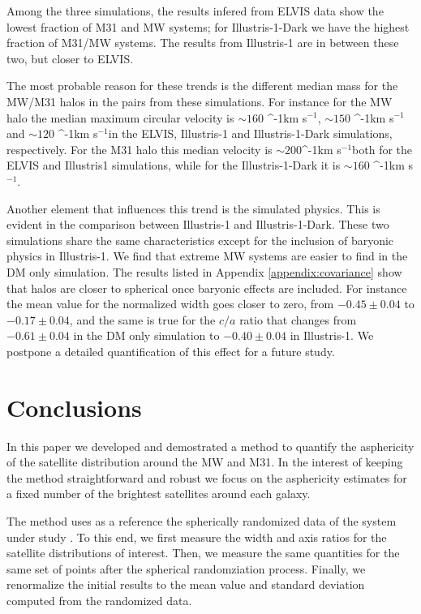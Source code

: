 \documentclass[a4paper,fleqn,usenatbib]{mnras}
\newcommand{\kms}{\ifmmode\mathrm{km\ s}^{-1}\else km s$^{-1}$\fi}
\begin{document}
Among the three simulations, the results infered from ELVIS data show
the lowest fraction of M31 and MW systems; for Illustris-1-Dark we have
the highest fraction of M31/MW systems. The results from Illustris-1
are in between these two, but closer to ELVIS.

The most probable reason for these trends is the different median mass
for the MW/M31 halos in the pairs from these simulations. 
For instance for the MW halo the median maximum circular velocity is
$\sim 160$ \kms, $\sim 150$ \kms and $\sim 120$ \kms in the ELVIS,
Illustris-1 and Illustris-1-Dark simulations, respectively.
For the M31 halo this median velocity is $\sim 200$\kms both for the
ELVIS and Illustris1 simulations, while for the Illustris-1-Dark it is
$\sim 160$ \kms. 

Another element that influences this trend is the simulated physics.
This is evident in the comparison between Illustris-1 and Illustris-1-Dark.
These two simulations share the same characteristics except for the
inclusion of baryonic physics in Illustris-1.
We find that extreme MW systems are easier to find in the DM only
simulation. 
The results listed in Appendix \ref{appendix:covariance} show that
halos are closer to spherical once baryonic effects are included. 
For instance the mean value for the normalized width goes closer to
zero, from $-0.45\pm 0.04$  to $-0.17\pm0.04$, and the same is true
for the $c/a$ ratio that changes from $-0.61\pm0.04$ in the DM only
simulation to $-0.40\pm 0.04$ in Illustris-1.  
We postpone a detailed quantification of this effect for a future
study. 

\section{Conclusions}\label{sec:conclusions}

In this paper we developed and demostrated a method to quantify the
asphericity of the satellite distribution around the MW and M31.  
In the interest of keeping the method straightforward and robust we
focus on the asphericity estimates for a fixed number of the brightest
satellites around each galaxy. 

The method uses as a reference the spherically randomized data
of the system under study \citep{2017AN....338..854P}.  
To this end, we first measure the width and axis ratios for the satellite
distributions of interest. 
Then, we measure the same quantities for the same set of points after
the spherical randomziation process.
Finally, we renormalize the initial results to the mean value and
standard deviation computed from the randomized data.  
\end{document}
